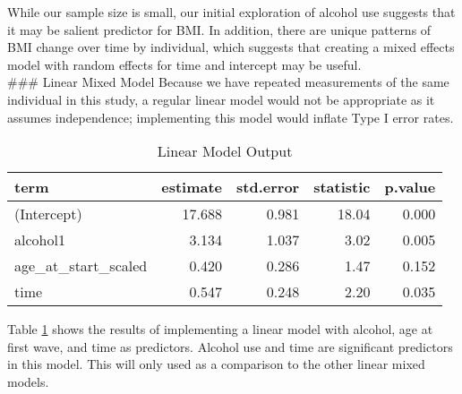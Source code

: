 \documentclass[12pt, twoside]{amherstthesis}
\begin{document}
While our sample size is small, our initial exploration of alcohol use suggests that it may be salient predictor for BMI. In addition, there are unique patterns of BMI change over time by individual, which suggests that creating a mixed effects model with random effects for time and intercept may be useful.\\
\#\#\# Linear Mixed Model
Because we have repeated measurements of the same individual in this study, a regular linear model would not be appropriate as it assumes independence; implementing this model would inflate Type I error rates.
\begin{table}[H]

\caption{\label{tab:lm}Linear Model Output}
\centering
\begin{tabular}[t]{lrrrr}
\toprule
term & estimate & std.error & statistic & p.value\\
\midrule
(Intercept) & 17.688 & 0.981 & 18.04 & 0.000\\
alcohol1 & 3.134 & 1.037 & 3.02 & 0.005\\
age\_at\_start\_scaled & 0.420 & 0.286 & 1.47 & 0.152\\
time & 0.547 & 0.248 & 2.20 & 0.035\\
\bottomrule
\end{tabular}
\end{table}
Table \ref{tab:lm} shows the results of implementing a linear model with alcohol, age at first wave, and time as predictors. Alcohol use and time are significant predictors in this model. This will only used as a comparison to the other linear mixed models.
\end{document}
